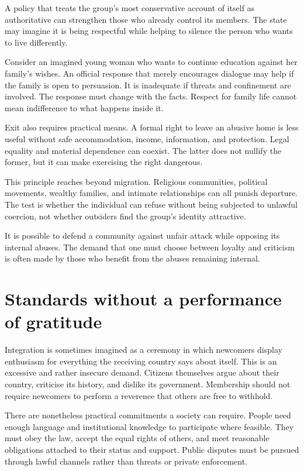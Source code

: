 \documentclass[12pt,a4paper]{book}
\begin{document}
A policy that treats the group's most conservative account of itself as authoritative can strengthen those who already control its members. The state may imagine it is being respectful while helping to silence the person who wants to live differently.

Consider an imagined young woman who wants to continue education against her family's wishes. An official response that merely encourages dialogue may help if the family is open to persuasion. It is inadequate if threats and confinement are involved. The response must change with the facts. Respect for family life cannot mean indifference to what happens inside it.

Exit also requires practical means. A formal right to leave an abusive home is less useful without safe accommodation, income, information, and protection. Legal equality and material dependence can coexist. The latter does not nullify the former, but it can make exercising the right dangerous.

This principle reaches beyond migration. Religious communities, political movements, wealthy families, and intimate relationships can all punish departure. The test is whether the individual can refuse without being subjected to unlawful coercion, not whether outsiders find the group's identity attractive.

It is possible to defend a community against unfair attack while opposing its internal abuses. The demand that one must choose between loyalty and criticism is often made by those who benefit from the abuses remaining internal.

\section*{Standards without a performance of gratitude}

Integration is sometimes imagined as a ceremony in which newcomers display enthusiasm for everything the receiving country says about itself. This is an excessive and rather insecure demand. Citizens themselves argue about their country, criticise its history, and dislike its government. Membership should not require newcomers to perform a reverence that others are free to withhold.

There are nonetheless practical commitments a society can require. People need enough language and institutional knowledge to participate where feasible. They must obey the law, accept the equal rights of others, and meet reasonable obligations attached to their status and support. Public disputes must be pursued through lawful channels rather than threats or private enforcement.
\end{document}
